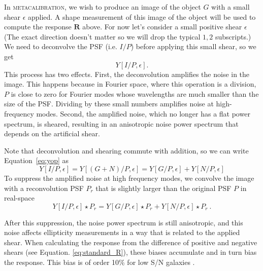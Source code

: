 \documentclass[twocolumn]{openjournal}
\makeatletter
\newcommand{\mcal}{\textsc{metacalibration}\@\xspace}
\makeatother
\begin{document}
In \mcal, we wish to produce an image of the object $G$ with a small shear $\epsilon$ applied.
A shape measurement of this image of the object will be used to compute the response
$\mathbf{R}$ above. For now let's consider a small positive shear $\epsilon$
(The exact direction doesn't matter so we will drop the typical $1,2$
subscripts.) We need to deconvolve the PSF (i.e. $I/P$) before applying this small
shear, so we get
\begin{equation} \label{eq:yop}
Y[I/P,\epsilon].
\end{equation}
This process has two effects. First, the deconvolution amplifies the noise in the
image. This happens because in Fourier space, where this operation is a division, $P$ is
close to zero for Fourier modes whose wavelengths are much smaller than the size of the
PSF. Dividing by these small numbers amplifies noise at high-frequency modes. Second,
the amplified noise, which no longer has a flat power spectrum, is sheared, resulting
in an anisotropic noise power spectrum that depends on the artificial
shear.

Note that deconvolution and shearing commute with addition, so we can write
Equation~\ref{eq:yop} as
\begin{equation*}
Y[I/P,\epsilon] = Y[(G+N)/P,\epsilon] = Y[G/P,\epsilon] + Y[N/P,\epsilon]
\end{equation*}
To suppress the amplified noise at high frequency modes, we convolve the image
with a reconvolution PSF $P_r$ that is
slightly larger than the original PSF $P$ in real-space
\begin{equation} \label{eq:dilate}
Y[I/P,\epsilon]\star P_r = Y[G/P,\epsilon]\star P_r + Y[N/P,\epsilon]\star P_r\ .
\end{equation}

After this suppression, the noise power spectrum is still anisotropic, and
this noise affects ellipticity measurements in a way that is related to the applied
shear.  When calculating the response from the difference of
positive and negative shears (see Equation. \ref{eq:standard_R}), these biases
accumulate and in turn bias the response.
This bias is of order 10\% for low S/N galaxies \citep{SheldonMcal2017}.
\end{document}
